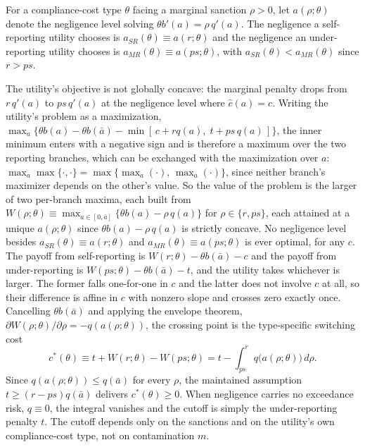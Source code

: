 \documentclass[12pt]{article}
\begin{document}
    For a compliance-cost type $\theta$ facing a marginal sanction $\rho > 0$, let $a(\rho;\theta)$ denote the negligence level solving $\theta b'(a) = \rho\,q'(a)$. The negligence a self-reporting utility chooses is $a_{SR}(\theta) \equiv a(r;\theta)$ and the negligence an under-reporting utility chooses is $a_{MR}(\theta) \equiv a(ps;\theta)$, with $a_{SR}(\theta) < a_{MR}(\theta)$ since $r > ps$.

	The utility's objective is not globally concave: the marginal penalty drops from $r\,q'(a)$ to $ps\,q'(a)$ at the negligence level where $\hat{c}(a) = c$. Writing the utility's problem as a maximization, $\max_a\{\theta b(a) - \theta b(\bar a) - \min[\,c + r q(a),\; t + ps\,q(a)\,]\}$, the inner minimum enters with a negative sign and is therefore a maximum over the two reporting branches, which can be exchanged with the maximization over $a$: $\max_a \max\{\cdot,\cdot\} = \max\{\max_a(\cdot),\, \max_a(\cdot)\}$, since neither branch's maximizer depends on the other's value. So the value of the problem is the larger of two per-branch maxima, each built from $W(\rho;\theta) \equiv \max_{a \in [0,\bar{a}]} \{\theta b(a) - \rho\, q(a)\}$ for $\rho \in \{r, ps\}$, each attained at a unique $a(\rho;\theta)$ since $\theta b(a) - \rho\, q(a)$ is strictly concave. No negligence level besides $a_{SR}(\theta) \equiv a(r;\theta)$ and $a_{MR}(\theta) \equiv a(ps;\theta)$ is ever optimal, for any $c$. The payoff from self-reporting is $W(r;\theta) - \theta b(\bar{a}) - c$ and the payoff from under-reporting is $W(ps;\theta) - \theta b(\bar{a}) - t$, and the utility takes whichever is larger. The former falls one-for-one in $c$ and the latter does not involve $c$ at all, so their difference is affine in $c$ with nonzero slope and crosses zero exactly once. Cancelling $\theta b(\bar{a})$ and applying the envelope theorem, $\partial W(\rho;\theta)/\partial\rho = -q(a(\rho;\theta))$, the crossing point is the type-specific switching cost
	\begin{equation}\label{eq:cstar}
		c^*(\theta) \equiv t + W(r;\theta) - W(ps;\theta) = t - \int_{ps}^{r} q\big(a(\rho;\theta)\big)\, d\rho.
	\end{equation}
	Since $q(a(\rho;\theta)) \le q(\bar{a})$ for every $\rho$, the maintained assumption $t \ge (r-ps)q(\bar{a})$ delivers $c^*(\theta) \ge 0$. When negligence carries no exceedance risk, $q \equiv 0$, the integral vanishes and the cutoff is simply the under-reporting penalty $t$. The cutoff depends only on the sanctions and on the utility's own compliance-cost type, not on contamination $m$.
\end{document}
